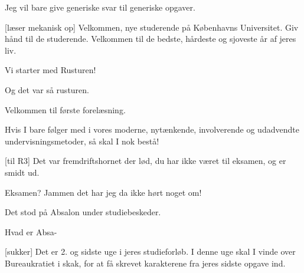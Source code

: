 \documentclass[a4paper,11pt]{article}
\begin{document}
\begin{sketch}

 Jeg vil bare give generiske svar til generiske opgaver.

[læser mekanisk op] Velkommen, nye studerende på Københavns
Universitet.  Giv hånd til de studerende.    Velkommen til de bedste, hårdeste og
sjoveste år af jeres liv.


 Vi starter med Rusturen!



 Og det var så rusturen.


 Velkommen til første forelæsning.


 Hvis I bare følger med i vores moderne, nytænkende,
involverende og udadvendte undervisningsmetoder, så skal I nok bestå!




[til R3] Det var fremdriftshornet der lød, du har ikke været til
eksamen, og er smidt ud.

 Eksamen?  Jammen det har jeg da ikke hørt noget om!

 Det stod på Absalon under studiebeskeder.

 Hvad er Absa-



[sukker] Det er 2. og sidste uge i jeres studieforløb.  I
denne uge skal I vinde over Bureaukratiet i skak, for at få skrevet
karakterene fra jeres sidste opgave ind.


\end{sketch}
\end{document}
